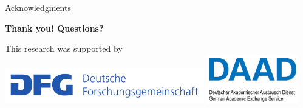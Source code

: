 \begin{frame}{Acknowledgments}

{\Huge \textbf{Thank you! \alert{Questions?}}}

\vspace{2em}

{\normalsize This research was supported by}
\includegraphics[width=0.65\textwidth]{figures/dfg} \includegraphics[width=0.3\textwidth]{figures/daad}

\end{frame}


